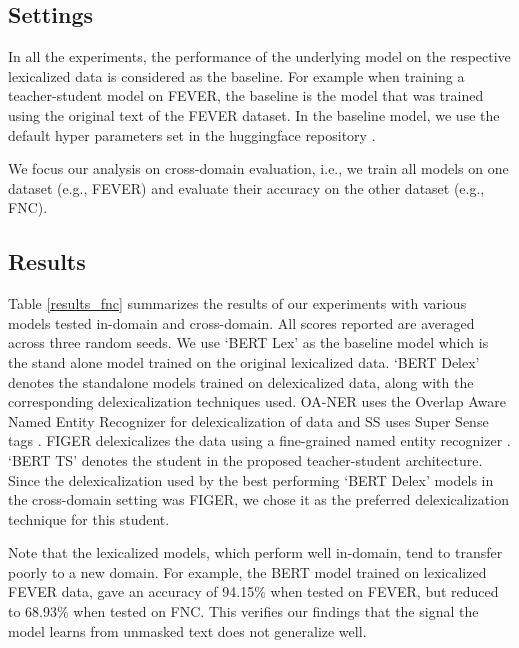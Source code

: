 \subsection{Settings}


In all the experiments, the performance of the underlying model on the respective lexicalized data is considered as the baseline. For example when training a teacher-student model on FEVER, the baseline is the model that was trained using the original text of the FEVER dataset. In the baseline model, we use the default hyper parameters set in the huggingface repository \citep{wolf2019huggingface}.


We focus our analysis on cross-domain evaluation, i.e., we train all models on one dataset  (e.g., FEVER) and evaluate their accuracy on the other dataset (e.g., FNC).



\subsection{Results}
Table \ref{results_fnc} summarizes the results of our experiments with various models tested in-domain and cross-domain. All scores reported are averaged across three random seeds. We use `BERT Lex' as the baseline model which is the stand alone model trained on the original lexicalized data. `BERT Delex' denotes the standalone models trained on delexicalized data, along with the corresponding delexicalization techniques used. OA-NER uses the Overlap Aware Named Entity Recognizer for delexicalization of data and SS uses Super Sense tags \citep{suntwal-etal-2019-importance}. FIGER delexicalizes the data using a fine-grained named entity recognizer \citep{ling2012fine}.  `BERT TS' denotes the student in the proposed teacher-student architecture.  Since the delexicalization used by the best performing `BERT Delex' models in the cross-domain setting was FIGER, we chose it as the preferred delexicalization technique for this student.

Note that the lexicalized models, which perform well in-domain, tend to transfer poorly to a new domain. For example, the BERT model trained
on lexicalized FEVER data, gave an accuracy of 94.15\% when tested on FEVER, but reduced to 68.93\% when tested on FNC.
This verifies our findings that the signal the model learns from unmasked text does not generalize well.

